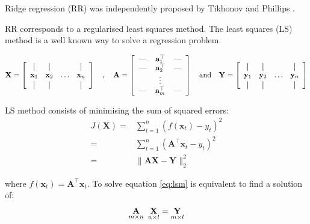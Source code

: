 Ridge regression (RR) was independently proposed by Tikhonov \cite{tikhonov1963}
and Phillips \cite{phillips1962}. 

RR corresponds to a regularised least squares
method. The least squares (LS) method is a well known way to solve a regression
problem.  

\begin{equation}
\label{eq:RRdefinitions}
\mathbf{X} = 
\left[
  \begin{array}{cccc}
    \vertbar & \vertbar &        & \vertbar \\
    \mathbf{x}_{1}    & \mathbf{x}_{2}    & \ldots & \mathbf{x}_{n}    \\
    \vertbar & \vertbar &        & \vertbar 
  \end{array}
\right]
\quad , \quad
\mathbf{A} = 
\left[
  \begin{tabular}{c>{$}c<{$}c}
    --- & \mathbf{a}^{\top}_{1} & ---\\
    --- & \mathbf{a}^{\top}_{2} & ---\\
    & \vdots & \\
    --- & \mathbf{a}^{\top}_{m} & ---
  \end{tabular}
\right]
\quad \text{and} \quad
\mathbf{Y} = 
\left[
  \begin{array}{cccc}
    \vertbar & \vertbar &        & \vertbar \\
    \mathbf{y}_{1}    & \mathbf{y}_{2}    & \ldots & \mathbf{y}_{n}    \\
    \vertbar & \vertbar &        & \vertbar 
  \end{array}
\right]
\end{equation}

LS method consists of minimising the sum of squared errors:
\begin{eqnarray*}
\label{eq:lsm}
 J(\mathbf{X}) =& \displaystyle \sum_{t=1}^n (f(\mathbf{x}_t)-y_t)^2 \\
 =&\displaystyle \sum_{t=1}^n (\mathbf{\mathbf{A}}^\top {\mathbf{x}}_t-y_t)^2 \\
 =& \| \mathbf{A}\mathbf{\mathbf{X}} - \mathbf{Y} \|_2^2 
\end{eqnarray*}

\noindent where $f(\mathbf{x}_t)={\mathbf{A}}^\top {\mathbf{x}}_t$. To solve equation \ref{eq:lsm} is equivalent to find a solution of:
\begin{equation}
\label{eq:regproblem}
\underset{m \times n}{\mathbf{A}} \enskip \underset{n \times
l}{\mathbf{\mathbf{X}}} = \underset{m \times l}{\mathbf{Y}}
\end{equation}

